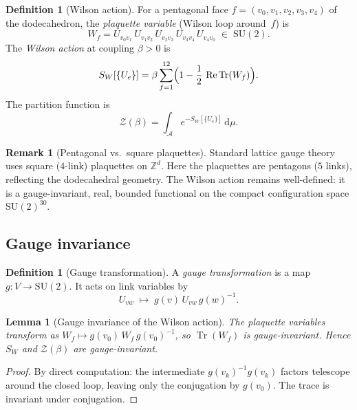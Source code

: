 \documentclass[12pt,a4paper]{article}
\newtheorem{lemma}[theorem]{Lemma}
\theoremstyle{definition}
\newtheorem{definition}[theorem]{Definition}
\newtheorem{remark}[theorem]{Remark}
\theoremstyle{remark}
\newcommand{\Z}{\mathbb{Z}}
\newcommand{\SU}{\mathrm{SU}}
\newcommand{\Tr}{\operatorname{Tr}}
\newcommand{\Zcal}{\mathcal{Z}}
\begin{document}
\begin{definition}[Wilson action]\label{def:wilsonaction}
For a pentagonal face $f = (v_0, v_1, v_2, v_3, v_4)$ of the
dodecahedron, the \emph{plaquette variable} (Wilson loop around~$f$) is
\begin{equation}\label{eq:plaquette}
  W_f = U_{v_0 v_1}\, U_{v_1 v_2}\, U_{v_2 v_3}\, U_{v_3 v_4}\, U_{v_4 v_0}
  \;\in\; \SU(2).
\end{equation}
The \emph{Wilson action} at coupling $\beta > 0$ is
\begin{equation}\label{eq:wilson}
  S_W[\{U_e\}] = \beta \sum_{f=1}^{12}
    \Bigl(1 - \frac{1}{2}\,\operatorname{Re}\Tr(W_f)\Bigr).
\end{equation}
The partition function is
\begin{equation}\label{eq:partition}
  \Zcal(\beta) = \int_{\mathcal{A}} e^{-S_W[\{U_e\}]}\,\mathrm{d}\mu.
\end{equation}
\end{definition}

\begin{remark}[Pentagonal vs.\ square plaquettes]
Standard lattice gauge theory uses square ($4$-link) plaquettes on
$\Z^d$.  Here the plaquettes are pentagons ($5$ links), reflecting the
dodecahedral geometry.  The Wilson action remains well-defined: it is
a gauge-invariant, real, bounded functional on the compact configuration
space $\SU(2)^{30}$.
\end{remark}

\subsection{Gauge invariance}\label{ssec:gauge}

\begin{definition}[Gauge transformation]\label{def:gauge}
A \emph{gauge transformation} is a map $g: V \to \SU(2)$.
It acts on link variables by
\[
  U_{vw} \;\mapsto\; g(v)\, U_{vw}\, g(w)^{-1}.
\]
\end{definition}

\begin{lemma}[Gauge invariance of the Wilson action]\label{lem:gaugeinv}
The plaquette variables transform as
$W_f \mapsto g(v_0)\, W_f\, g(v_0)^{-1}$,
so $\Tr(W_f)$ is gauge-invariant.  Hence $S_W$ and $\Zcal(\beta)$ are
gauge-invariant.
\end{lemma}

\begin{proof}
By direct computation: the intermediate $g(v_k)^{-1} g(v_k)$ factors
telescope around the closed loop, leaving only the conjugation by $g(v_0)$.
The trace is invariant under conjugation.
\end{proof}
\end{document}
